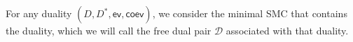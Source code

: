 \documentclass[pra,floatfix,
amsmath,superscriptaddress, 12pt]{article}
\theoremstyle{definition}
\newcommand{\cC}{\mathbf{C}}
\newcommand{\fF}{\mathfrak{F}}
\newcommand{\cG}{\mathcal{G}}
\newcommand{\cD}{\mathcal{D}}
\newcommand{\Ob}{\mathsf{Ob}}
\newcommand{\evmap}{\mathsf{ev}}
\newcommand{\coev}{\mathsf{coev}}
\newcommand{\msf}[1]{\mathsf{#1}}
\begin{document}
For any duality $(D,D^*,\textsf{ev},\textsf{coev})$, we consider the minimal SMC that contains the duality, which we will call the free dual pair $\cD$ associated with that duality.\\
















\end{document}
